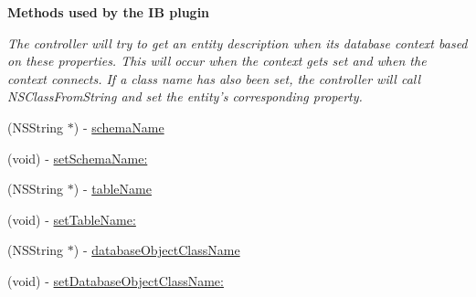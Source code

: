 \begin{Indent}{\bf Methods used by the I\+B plugin}\par
{\em The controller will try to get an entity description when its database context based on these properties. This will occur when the context gets set and when the context connects. If a class name has also been set, the controller will call N\+S\+Class\+From\+String and set the entity's corresponding property. }\begin{DoxyCompactItemize}
\item 
\hypertarget{interface_b_x_synchronized_array_controller_ad5469de11657d55b2b0ce0b7158806d8}{}(N\+S\+String $\ast$) -\/ \hyperlink{interface_b_x_synchronized_array_controller_ad5469de11657d55b2b0ce0b7158806d8}{schema\+Name}\label{interface_b_x_synchronized_array_controller_ad5469de11657d55b2b0ce0b7158806d8}

\item 
\hypertarget{interface_b_x_synchronized_array_controller_af6a75bbcc92629c7cdceebb16284c4a5}{}(void) -\/ \hyperlink{interface_b_x_synchronized_array_controller_af6a75bbcc92629c7cdceebb16284c4a5}{set\+Schema\+Name\+:}\label{interface_b_x_synchronized_array_controller_af6a75bbcc92629c7cdceebb16284c4a5}

\item 
\hypertarget{interface_b_x_synchronized_array_controller_a6ddffbf2a957c9c492adfd36d9d78831}{}(N\+S\+String $\ast$) -\/ \hyperlink{interface_b_x_synchronized_array_controller_a6ddffbf2a957c9c492adfd36d9d78831}{table\+Name}\label{interface_b_x_synchronized_array_controller_a6ddffbf2a957c9c492adfd36d9d78831}

\item 
\hypertarget{interface_b_x_synchronized_array_controller_a3e6c79db00f483ad8293021a7a2b46f8}{}(void) -\/ \hyperlink{interface_b_x_synchronized_array_controller_a3e6c79db00f483ad8293021a7a2b46f8}{set\+Table\+Name\+:}\label{interface_b_x_synchronized_array_controller_a3e6c79db00f483ad8293021a7a2b46f8}

\item 
\hypertarget{interface_b_x_synchronized_array_controller_a8bf18491bebe11ba20b353763e7ac697}{}(N\+S\+String $\ast$) -\/ \hyperlink{interface_b_x_synchronized_array_controller_a8bf18491bebe11ba20b353763e7ac697}{database\+Object\+Class\+Name}\label{interface_b_x_synchronized_array_controller_a8bf18491bebe11ba20b353763e7ac697}

\item 
\hypertarget{interface_b_x_synchronized_array_controller_a0d2a8f1d22f5b0aef3f41a977f06abfc}{}(void) -\/ \hyperlink{interface_b_x_synchronized_array_controller_a0d2a8f1d22f5b0aef3f41a977f06abfc}{set\+Database\+Object\+Class\+Name\+:}\label{interface_b_x_synchronized_array_controller_a0d2a8f1d22f5b0aef3f41a977f06abfc}

\end{DoxyCompactItemize}
\end{Indent}
